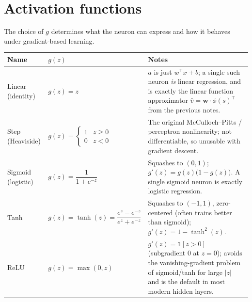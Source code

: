 \documentclass[11pt]{article}
\begin{document}
\begin{center}
\end{center}

\section{Activation functions}

The choice of $g$ determines what the neuron can express and how it
behaves under gradient-based learning.

\begin{center}
\begin{tabular}{@{}p{2.6cm}p{5.0cm}p{5.6cm}@{}}
\toprule
Name & $g(z)$ & Notes \\
\midrule
Linear (identity) & $g(z) = z$ & $a$ is just $w^{\top}x+b$; a single such
neuron \emph{is} linear regression, and is exactly the linear function
approximator $\hat v = \mathbf{w}\cdot\phi(s)^\top$ from the previous
notes. \\
Step (Heaviside) & $g(z) = \begin{cases} 1 & z \geq 0 \\ 0 & z < 0
\end{cases}$ & The original McCulloch--Pitts / perceptron
nonlinearity; not differentiable, so unusable with gradient descent. \\
Sigmoid (logistic) & $g(z) = \dfrac{1}{1+e^{-z}}$ & Squashes to $(0,1)$;
$g'(z) = g(z)\big(1-g(z)\big)$. A single sigmoid neuron is exactly logistic
regression. \\
Tanh & $g(z) = \tanh(z) = \dfrac{e^{z}-e^{-z}}{e^{z}+e^{-z}}$ & Squashes to
$(-1,1)$, zero-centered (often trains better than sigmoid);
$g'(z) = 1 - \tanh^2(z)$. \\
ReLU & $g(z) = \max(0, z)$ & $g'(z) = \mathbb{1}[z>0]$ (subgradient $0$ at
$z=0$); avoids the vanishing-gradient problem of sigmoid/tanh for large
$|z|$ and is the default in most modern hidden layers. \\
\bottomrule
\end{tabular}
\end{center}
\end{document}
